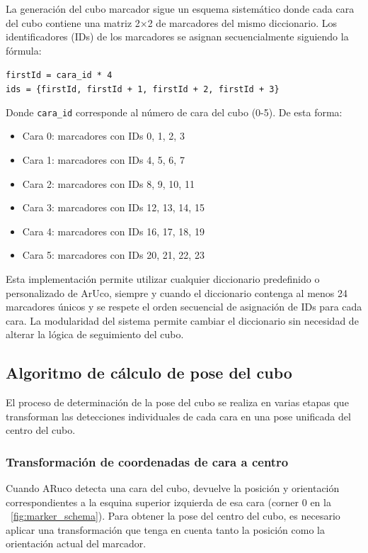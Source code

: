 La generación del cubo marcador sigue un esquema sistemático donde cada cara del cubo contiene una matriz 2×2 de marcadores del mismo diccionario. Los identificadores (IDs) de los marcadores se asignan secuencialmente siguiendo la fórmula:

\begin{center}
\texttt{firstId = cara\_id * 4}\\
\texttt{ids = \{firstId, firstId + 1, firstId + 2, firstId + 3\}}
\end{center}

Donde \texttt{cara\_id} corresponde al número de cara del cubo (0-5). De esta forma:
\begin{itemize}
	\item Cara 0: marcadores con IDs 0, 1, 2, 3
	\item Cara 1: marcadores con IDs 4, 5, 6, 7
	\item Cara 2: marcadores con IDs 8, 9, 10, 11
	\item Cara 3: marcadores con IDs 12, 13, 14, 15
	\item Cara 4: marcadores con IDs 16, 17, 18, 19
	\item Cara 5: marcadores con IDs 20, 21, 22, 23
\end{itemize}

Esta implementación permite utilizar cualquier diccionario predefinido o personalizado de ArUco, siempre y cuando el diccionario contenga al menos 24 marcadores únicos y se respete el orden secuencial de asignación de IDs para cada cara. La modularidad del sistema permite cambiar el diccionario sin necesidad de alterar la lógica de seguimiento del cubo.

\subsection{Algoritmo de cálculo de pose del cubo}
\label{subsec:algoritmo_pose}

El proceso de determinación de la pose del cubo se realiza en varias etapas que transforman las detecciones individuales de cada cara en una pose unificada del centro del cubo.

\subsubsection{Transformación de coordenadas de cara a centro}
Cuando ARuco detecta una cara del cubo, devuelve la posición y orientación correspondientes a la esquina superior izquierda de esa cara (corner 0 en la \figurename~\ref{fig:marker_schema}). Para obtener la pose del centro del cubo, es necesario aplicar una transformación que tenga en cuenta tanto la posición como la orientación actual del marcador.

